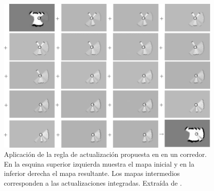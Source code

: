 \begin{figure}[H]
  \center
  \includegraphics[width=1.00\linewidth]{imagenes/occgridUpdate.png}
  \caption[Aplicación de la regla de actualización propuesta en
  \cite{stachniss2009robotic} en un corredor.]{Aplicación de la
    regla de actualización propuesta en \cite{stachniss2009robotic} en un
    corredor. En la esquina superior izquierda muestra el mapa inicial y
    en la inferior derecha el mapa resultante. Los mapas intermedios corresponden a las actualizaciones integradas. Extraída de
  \cite{stachniss2009robotic}. }
  \label{fig:mappingUpRule}
\end{figure} 











